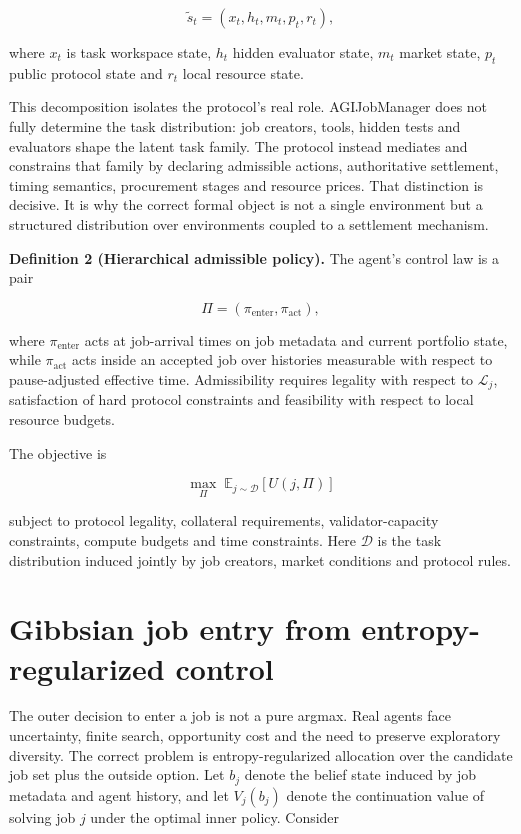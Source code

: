 \[
\tilde s_t = (x_t,h_t,m_t,p_t,r_t),
\]

where \(x_t\) is task workspace state, \(h_t\) hidden evaluator state,
\(m_t\) market state, \(p_t\) public protocol state and \(r_t\) local
resource state.

This decomposition isolates the protocol's real role. AGIJobManager does
not fully determine the task distribution: job creators, tools, hidden
tests and evaluators shape the latent task family. The protocol instead
mediates and constrains that family by declaring admissible actions,
authoritative settlement, timing semantics, procurement stages and
resource prices. That distinction is decisive. It is why the correct
formal object is not a single environment but a structured distribution
over environments coupled to a settlement mechanism.

\textbf{Definition 2 (Hierarchical admissible policy).} The agent's
control law is a pair

\[
\Pi = (\pi_{\mathrm{enter}},\pi_{\mathrm{act}}),
\]

where \(\pi_{\mathrm{enter}}\) acts at job-arrival times on job metadata
and current portfolio state, while \(\pi_{\mathrm{act}}\) acts inside an
accepted job over histories measurable with respect to pause-adjusted
effective time. Admissibility requires legality with respect to
\(\mathcal{L}_j\), satisfaction of hard protocol constraints and
feasibility with respect to local resource budgets.

The objective is

\[
\max_{\Pi}\;\mathbb{E}_{j\sim\mathcal{D}}
\left[
U(j,\Pi)\right]
\]

subject to protocol legality, collateral requirements,
validator-capacity constraints, compute budgets and time constraints.
Here \(\mathcal{D}\) is the task distribution induced jointly by job
creators, market conditions and protocol rules.

\section{Gibbsian job entry from entropy-regularized
control}\label{gibbsian-job-entry-from-entropy-regularized-control}

The outer decision to enter a job is not a pure argmax. Real agents face
uncertainty, finite search, opportunity cost and the need to preserve
exploratory diversity. The correct problem is entropy-regularized
allocation over the candidate job set plus the outside option. Let
\(b_j\) denote the belief state induced by job metadata and agent
history, and let \(V_j(b_j)\) denote the continuation value of solving
job \(j\) under the optimal inner policy. Consider


